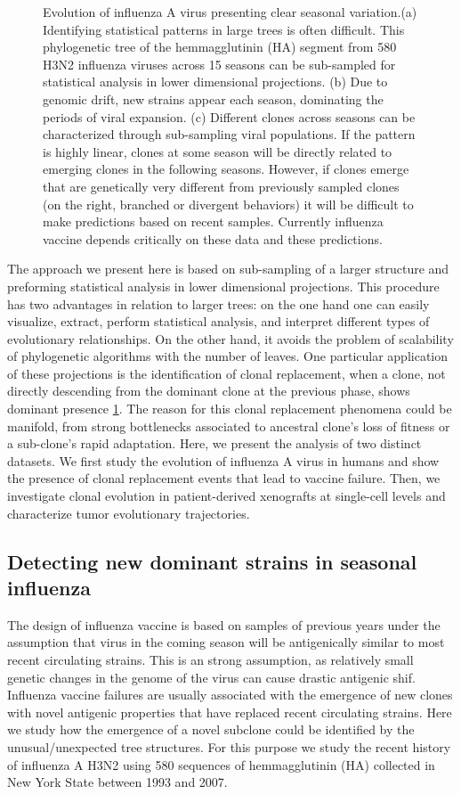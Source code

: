 \documentclass[a4paper,11pt]{article}
\begin{document}
\begin{figure}
    \caption{Evolution of influenza A virus presenting clear seasonal variation.(a) Identifying statistical patterns in large trees is often difficult. This phylogenetic tree of the hemmagglutinin (HA) segment from 580 H3N2 influenza viruses across 15 seasons  can be  sub-sampled for statistical analysis in lower dimensional projections. (b)  Due to genomic drift, new strains appear each season, dominating the periods of viral expansion. (c) Different clones across seasons can be characterized through sub-sampling viral populations. If the pattern is highly linear, clones at some season will be directly related to emerging clones in the following seasons. However, if clones emerge that are genetically very different from previously sampled clones (on the right, branched or divergent behaviors) it will be difficult to make predictions based on recent samples. Currently influenza vaccine depends critically on these data and these predictions.}
     \label{fig:flu_schematic}
\end{figure}

The approach we present here is based on sub-sampling of a larger structure and preforming statistical analysis in lower dimensional projections.
This procedure has two advantages in relation to larger trees: on the one hand one can easily visualize, extract, perform statistical analysis, and interpret different types of evolutionary relationships.
On the other hand, it avoids the problem of scalability of phylogenetic algorithms with the number of leaves.
One particular application of these projections is the identification of clonal replacement, when a clone, not directly descending from the dominant clone at the previous phase, shows dominant presence \ref{fig:flu_schematic}.
The reason for this clonal replacement phenomena could be manifold, from strong bottlenecks associated to ancestral clone's loss of fitness or a sub-clone's rapid adaptation.
Here, we present the analysis of two distinct datasets.
We first study the evolution of influenza A virus in humans and show the presence of clonal replacement events that lead to vaccine failure.
Then, we investigate clonal evolution in patient-derived xenografts at single-cell levels and characterize tumor evolutionary trajectories.

\subsection{Detecting new dominant strains in seasonal influenza}

The design of influenza vaccine is based on samples of previous years under the assumption that virus in the coming season will be antigenically similar to most recent circulating strains. This is an strong assumption, as relatively small genetic changes in the genome of the virus can cause drastic antigenic shif.  Influenza vaccine failures are usually associated with the emergence of new clones with novel antigenic properties that have replaced recent circulating strains. Here we study how the emergence of a novel subclone could be identified by the unusual/unexpected tree structures. For this purpose we study the recent history of influenza A H3N2 using 580 sequences of hemmagglutinin (HA) collected in New York State between 1993 and 2007.
\end{document}

